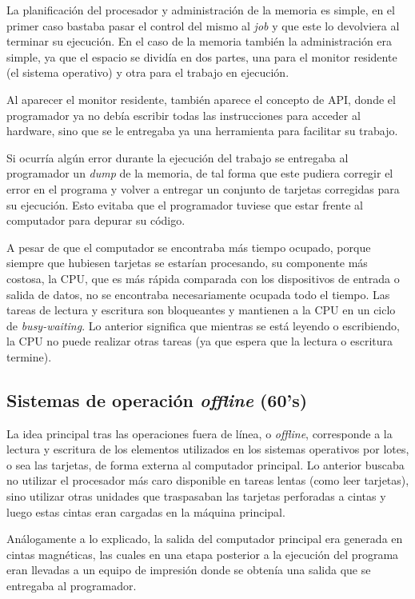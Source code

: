 La planificación del procesador y administración de la memoria es simple, en el
primer caso bastaba pasar el control del mismo al \textit{job} y que este lo
devolviera al terminar su ejecución. En el caso de la memoria también la
administración era simple, ya que el espacio se dividía en dos partes, una para
el monitor residente (el sistema operativo) y otra para el trabajo en
ejecución.

Al aparecer el monitor residente, también aparece el concepto de API, donde el
programador ya no debía escribir todas las instrucciones para acceder al
hardware, sino que se le entregaba ya una herramienta para facilitar su
trabajo.

Si ocurría algún error durante la ejecución del trabajo se entregaba al
programador un \textit{dump} de la memoria, de tal forma que este pudiera
corregir el error en el programa y volver a entregar un conjunto de tarjetas
corregidas para su ejecución. Esto evitaba que el programador tuviese que estar
frente al computador para depurar su código.

A pesar de que el computador se encontraba más tiempo ocupado, porque siempre
que hubiesen tarjetas se estarían procesando, su componente más costosa, la CPU,
que es más rápida comparada con los dispositivos de entrada o salida de datos,
no se encontraba necesariamente ocupada todo el tiempo. Las tareas de lectura y
escritura son bloqueantes y mantienen a la CPU en un ciclo de
\textit{busy-waiting}. Lo anterior significa que mientras se está leyendo o
escribiendo, la CPU no puede realizar otras tareas (ya que espera que la lectura
o escritura termine).

\subsection{Sistemas de operación \textit{offline} (60's)}
La idea principal tras las operaciones fuera de línea, o \textit{offline},
corresponde a la lectura y escritura de los elementos utilizados en los sistemas
operativos por lotes, o sea las tarjetas, de forma externa al computador
principal. Lo anterior buscaba no utilizar el procesador más caro disponible en
tareas lentas (como leer tarjetas), sino utilizar otras unidades que traspasaban
las tarjetas perforadas a cintas y luego estas cintas eran cargadas en la
máquina principal.

Análogamente a lo explicado, la salida del computador principal era generada en
cintas magnéticas, las cuales en una etapa posterior a la ejecución del programa
eran llevadas a un equipo de impresión donde se obtenía una salida que se
entregaba al programador.

